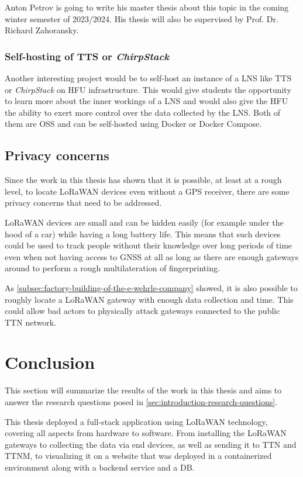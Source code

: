 Anton Petrov is going to write his master thesis about this topic in the coming winter semester of 2023/2024.
His thesis will also be supervised by Prof. Dr. Richard Zahoransky.

\subsubsection{Self-hosting of \acs{TTS} or \emph{ChirpStack}}

Another interesting project would be to self-host an instance of a \ac{LNS} like \ac{TTS} or \emph{ChirpStack} on \ac{HFU} infrastructure.
This would give students the opportunity to learn more about the inner workings of a \ac{LNS} and would also give the \ac{HFU} the ability to exert more control over the data collected by the \ac{LNS}.
Both of them are \ac{OSS} and can be self-hosted using Docker or Docker Compose.

\subsection{Privacy concerns}

Since the work in this thesis has shown that it is possible, at least at a rough level, to locate \ac{LoRaWAN} devices even without a \ac{GPS} receiver, there are some privacy concerns that need to be addressed.

\ac{LoRaWAN} devices are small and can be hidden easily (for example under the hood of a car) while having a long battery life.
This means that such devices could be used to track people without their knowledge over long periods of time even when not having access to \ac{GNSS} at all as long as there are enough gateways around to perform a rough multilateration of fingerprinting.

As \cref{subsec:factory-building-of-the-e-wehrle-company} showed, it is also possible to roughly locate a \ac{LoRaWAN} gateway with enough data collection and time.
This could allow bad actors to physically attack gateways connected to the public \ac{TTN} network.

\section{Conclusion}

This section will summarize the results of the work in this thesis and aims to answer the research questions posed in \cref{sec:introduction-research-questions}.

This thesis deployed a full-stack application using \ac{LoRaWAN} technology, covering all aspects from hardware to software.
From installing the \ac{LoRaWAN} gateways to collecting the data via end devices, as well as sending it to \ac{TTN} and \ac{TTNM}, to visualizing it on a website that was deployed in a containerized environment along with a backend service and a \ac{DB}.

